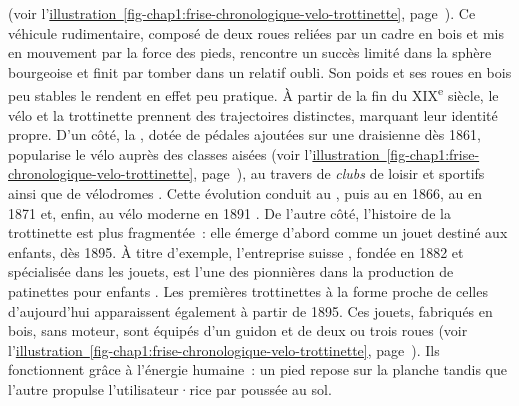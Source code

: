 \begin{refsegment}
{} (voir l'\hyperref[fig-chap1:frise-chronologique-velo-trottinette]{illustration~\ref{fig-chap1:frise-chronologique-velo-trottinette}}, page~\pageref{fig-chap1:frise-chronologique-velo-trottinette}). Ce véhicule rudimentaire, composé de deux roues reliées par un cadre en bois et mis en mouvement par la force des pieds, rencontre un succès limité dans la sphère bourgeoise et finit par tomber dans un relatif oubli. Son poids et ses roues en bois peu stables le rendent en effet peu pratique. À partir de la fin du XIX\textsuperscript{e} siècle, le vélo et la trottinette prennent des trajectoires distinctes, marquant leur identité propre. D’un côté, la , dotée de pédales ajoutées sur une draisienne dès 1861, popularise le vélo auprès des classes aisées (voir l'\hyperref[fig-chap1:frise-chronologique-velo-trottinette]{illustration~\ref{fig-chap1:frise-chronologique-velo-trottinette}}, page~\pageref{fig-chap1:frise-chronologique-velo-trottinette}), au travers de \textsl{clubs} de loisir et sportifs ainsi que de vélodromes \textcolor{blue}{\autocite[15-43]{dauncey_french_2012}}. Cette évolution conduit au , puis au  en 1866, au  en 1871 et, enfin, au vélo moderne en 1891 \textcolor{blue}{\autocite[27]{heran_retour_2015}}. De l’autre côté, l’histoire de la trottinette est plus fragmentée~: elle émerge d’abord comme un jouet destiné aux enfants, dès 1895. À titre d’exemple, l’entreprise suisse , fondée en 1882 et spécialisée dans les jouets, est l’une des pionnières dans la production de patinettes pour enfants \textcolor{blue}{\autocite{schweizerisches_nationalmuseum_draisine_2018}}. Les premières trottinettes à la forme proche de celles d’aujourd’hui apparaissent également à partir de 1895. Ces jouets, fabriqués en bois, sans moteur, sont équipés d’un guidon et de deux ou trois roues (voir l'\hyperref[fig-chap1:frise-chronologique-velo-trottinette]{illustration~\ref{fig-chap1:frise-chronologique-velo-trottinette}}, page~\pageref{fig-chap1:frise-chronologique-velo-trottinette}). Ils fonctionnent grâce à l’énergie humaine~: un pied repose sur la planche tandis que l’autre propulse l’utilisateur·rice par poussée au sol.%


\end{refsegment}
